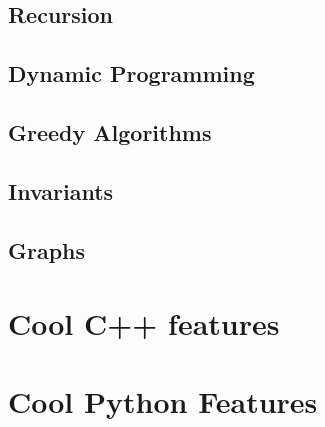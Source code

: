 \documentclass[runningheads]{llncs}
\begin{document}
\subsection{Recursion}
\subsection{Dynamic Programming}
\subsection{Greedy Algorithms}
\subsection{Invariants}
\subsection{Graphs}

\section{Cool C++ features}

\section{Cool Python Features}

%
%
 
 
\end{document}

